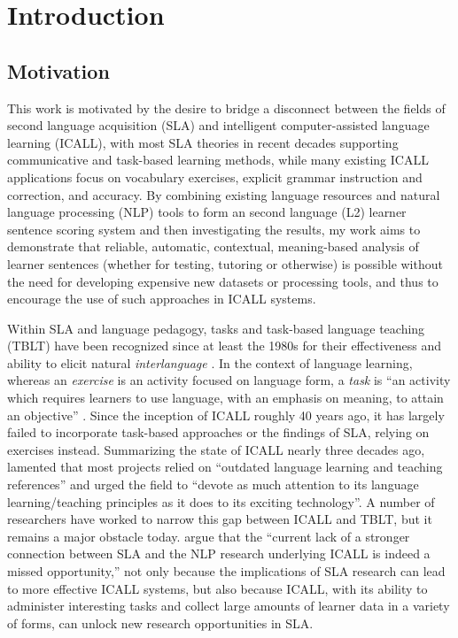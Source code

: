 \chapter{Introduction}
\label{chap:intro}

\section{Motivation}
\label{sec:motivation}


This work is motivated by the desire to bridge a disconnect between the fields of second language acquisition (SLA) and intelligent computer-assisted language learning (ICALL), with most SLA theories in recent decades supporting communicative and task-based learning methods, while many existing ICALL applications focus on vocabulary exercises, explicit grammar instruction and correction, and accuracy. By combining existing language resources and natural language processing (NLP) tools to form an second language (L2) learner sentence scoring system and then investigating the results, my work aims to demonstrate that reliable, automatic, contextual, meaning-based analysis of learner sentences (whether for testing, tutoring or otherwise) is possible without the need for developing expensive new datasets or processing tools, and thus to encourage the use of such approaches in ICALL systems. 

Within SLA and language pedagogy, tasks and task-based language teaching (TBLT) have been recognized since at least the 1980s for their effectiveness and ability to elicit natural \textit{interlanguage} \cite{ellis2003task}. In the context of language learning, whereas an \textit{exercise} is an activity focused on language form, a \textit{task} is ``an activity which requires learners to use language, with an emphasis on meaning, to attain an objective'' \cite{bygate2001researching}. Since the inception of ICALL roughly 40 years ago, it has largely failed to incorporate task-based approaches or the findings of SLA, relying on exercises instead. Summarizing the state of ICALL nearly three decades ago, \citet{oxford1993intelligent} lamented that most projects relied on ``outdated language learning and teaching references'' and urged the field to ``devote as much attention to its language learning/teaching principles as it does to its exciting technology''. A number of researchers have worked to narrow this gap between ICALL and TBLT, but it remains a major obstacle today. \citet{ziegler2017interdisciplinary} argue that the ``current lack of a stronger connection between SLA and the NLP research underlying ICALL is indeed a missed opportunity,'' not only because the implications of SLA research can lead to more effective ICALL systems, but also because ICALL, with its ability to administer interesting tasks and collect large amounts of learner data in a variety of forms, can unlock new research opportunities in SLA.


